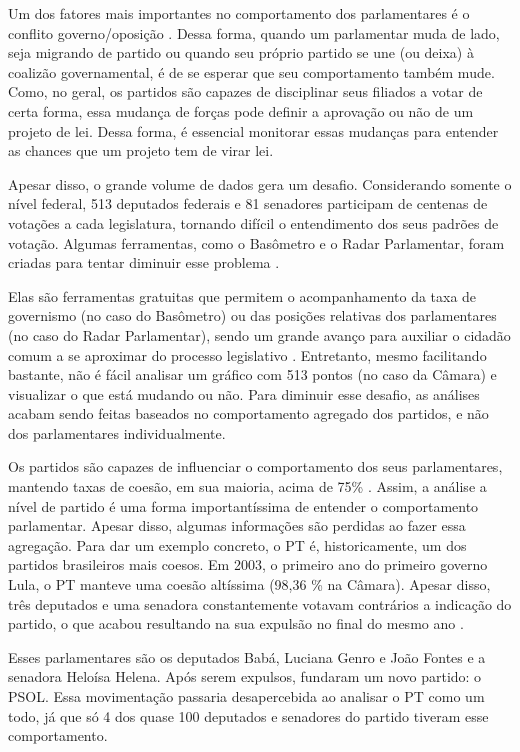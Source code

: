 Um dos fatores mais importantes no comportamento dos parlamentares é o conflito
governo/oposição \cite{Leoni2002,Desposato2005b,Freitas2012,Izumi2013}. Dessa
forma, quando um parlamentar muda de lado, seja migrando de partido ou quando
seu próprio partido se une (ou deixa) à coalizão governamental, é de se esperar
que seu comportamento também mude. Como, no geral, os partidos são capazes de
disciplinar seus filiados a votar de certa forma, essa mudança de forças pode
definir a aprovação ou não de um projeto de lei. Dessa forma, é essencial
monitorar essas mudanças para entender as chances que um projeto tem de virar
lei.

Apesar disso, o grande volume de dados gera um desafio. Considerando somente o
nível federal, 513 deputados federais e 81 senadores participam de centenas de
votações a cada legislatura, tornando difícil o entendimento dos seus padrões
de votação. Algumas ferramentas, como o Basômetro e o Radar Parlamentar, foram
criadas para tentar diminuir esse problema \cite{Estadao2012,Trento2013}.

Elas são ferramentas gratuitas que permitem o acompanhamento da taxa de
governismo (no caso do Basômetro) ou das posições relativas dos parlamentares
(no caso do Radar Parlamentar), sendo um grande avanço para auxiliar o cidadão
comum a se aproximar do processo legislativo \cite{Dantas2014}. Entretanto,
mesmo facilitando bastante, não é fácil analisar um gráfico com 513 pontos (no
caso da Câmara) e visualizar o que está mudando ou não. Para diminuir esse
desafio, as análises acabam sendo feitas baseados no comportamento agregado dos
partidos, e não dos parlamentares individualmente.

Os partidos são capazes de influenciar o comportamento dos seus parlamentares,
mantendo taxas de coesão, em sua maioria, acima de 75\%
\cite{Figueiredo2001,Cheibub2009,Zucco2009}. Assim, a análise a nível de partido
é uma forma importantíssima de entender o comportamento parlamentar. Apesar
disso, algumas informações são perdidas ao fazer essa agregação. Para dar um
exemplo concreto, o \gls{PT} é, historicamente, um dos partidos brasileiros mais
coesos. Em 2003, o primeiro ano do primeiro governo Lula, o \gls{PT} manteve uma
coesão altíssima (98,36 \% na Câmara). Apesar disso, três deputados e uma
senadora constantemente votavam contrários a indicação do partido, o que acabou
resultando na sua expulsão no final do mesmo ano \cite{Breve2013}.

Esses parlamentares são os deputados Babá, Luciana Genro e João Fontes e a
senadora Heloísa Helena. Após serem expulsos, fundaram um novo partido: o
\gls{PSOL}. Essa movimentação passaria desapercebida ao analisar o \gls{PT}
como um todo, já que só 4 dos quase 100 deputados e senadores do partido
tiveram esse comportamento.

